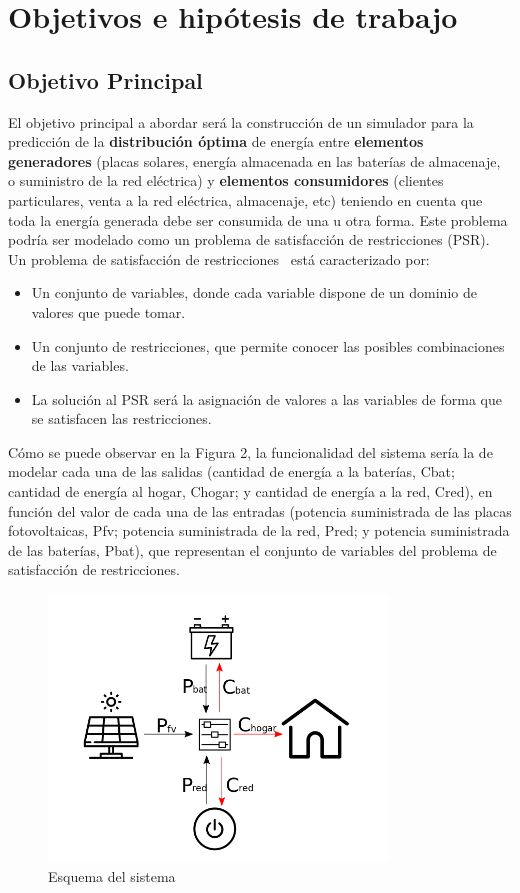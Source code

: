 \chapter{Objetivos e hipótesis de trabajo}
\label{cap:Objetivo}


\section{Objetivo Principal}
El objetivo principal a abordar será la construcción de un simulador para la predicción de la \textbf{distribución óptima} de energía entre \textbf{elementos generadores} (placas solares, energía almacenada en las baterías de almacenaje, o suministro de la red eléctrica) y \textbf{elementos consumidores} (clientes particulares, venta a la red eléctrica, almacenaje, etc) teniendo en cuenta que toda la energía generada debe ser consumida de una u otra forma.
Este problema podría ser modelado como un problema de satisfacción de restricciones (PSR).
Un problema de satisfacción de restricciones~\cite{Russ06} está caracterizado por:
\begin{itemize}
	\item Un conjunto de variables, donde cada variable dispone de un dominio de valores que puede tomar.
	\item Un conjunto de restricciones, que permite conocer las posibles combinaciones de las variables.
	\item La solución al PSR será la asignación de valores a las variables de forma que se satisfacen las restricciones.
\end{itemize} 
Cómo se puede observar en la Figura 2, la funcionalidad del sistema sería la de modelar cada una de las salidas (cantidad de energía a la baterías, Cbat; cantidad de energía al hogar, Chogar; y cantidad de energía a la red, Cred), en función del valor de cada una de las entradas (potencia suministrada de las placas fotovoltaicas, Pfv; potencia suministrada de la red, Pred; y potencia suministrada de las baterías, Pbat), que representan el conjunto de variables del problema de satisfacción de restricciones. 

\begin{figure}[!h]
	\centering
	\includegraphics[width=9cm]{figs/Esquema.png}
	\caption{Esquema del sistema}
\end{figure}

